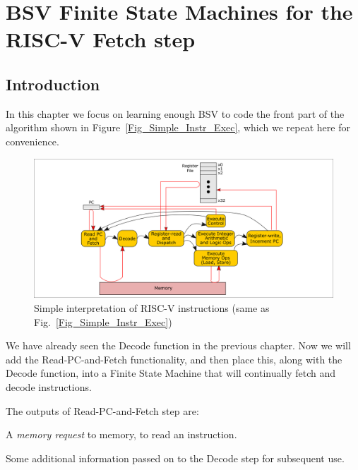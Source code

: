 

\chapter{BSV Finite State Machines for the RISC-V Fetch step}


\setcounter{page}{1}
\renewcommand{\thepage}{\arabic{chapter}-\arabic{page}}

\label{ch_FSM_Fetch}


\section{Introduction}

In this chapter we focus on learning enough BSV to code the front part
of the algorithm shown in Figure~\ref{Fig_Simple_Instr_Exec}, which we
repeat here for convenience.
\begin{figure}[htbp]
  \centerline{\includegraphics[width=6in,angle=0]{ch030_RISCV_Design_Space/Figures/Fig_Simple_Instr_Exec}}
  \caption{\label{Fig_FSM_Fetch_Simple_Instr_Exec}Simple interpretation of RISC-V instructions (same as Fig.~\ref{Fig_Simple_Instr_Exec})}
\end{figure}
We have
already seen the Decode function in the previous chapter.  Now we will
add the Read-PC-and-Fetch functionality, and then place this, along
with the Decode function, into a Finite State Machine that will
continually fetch and decode instructions.

The outputs of Read-PC-and-Fetch step are:
\begin{tightlist}

 \item A \emph{memory request} to memory, to read an instruction.

 \item Some additional information passed on to the Decode step for subsequent use.

\end{tightlist}

